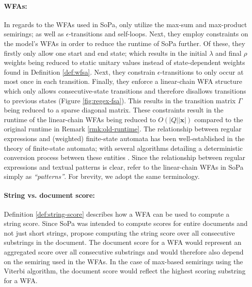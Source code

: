 \paragraph{WFAs:} In regards to the WFAs used in SoPa, \citet{schwartz2018sopa} only utilize the max-sum and max-product semirings; as well as $\epsilon$-transitions and self-loops. Next, they employ constraints on the model's WFAs in order to reduce the runtime of SoPa further. Of these, they firstly only allow one start and end state; which results in the initial $\lambda$ and final $\rho$ weights being reduced to static unitary values instead of state-dependent weights found in Definition \ref{def:wfsa}. Next, they constrain $\epsilon$-transitions to only occur at most once in each transition. Finally, they enforce a linear-chain WFA structure which only allows consecutive-state transitions and therefore disallows transitions to previous states (Figure \ref{fig:regex-fsa}). This results in the transition matrix $\Gamma$ being reduced to a sparse diagonal matrix. These constraints result in the runtime of the linear-chain WFAs being reduced to $O(|Q||\pmb{x}|)$ compared to the original runtime in Remark \ref{rmk:old-runtime}. The relationship between regular expressions and (weighted) finite-state automata has been well-established in the theory of finite-state automata; with several algorithms detailing a deterministic conversion process between these entities \citep{thompson1968programming,jiang2020cold}. Since the relationship between regular expressions and textual patterns is clear, \citet[Page 3, Section 3.1]{schwartz2018sopa} refer to the linear-chain WFAs in SoPa simply as \textit{``patterns''}. For brevity, we adopt the same terminology.

\paragraph{String vs. document score:} Definition \ref{def:string-score} describes how a WFA can be used to compute a string score. Since SoPa was intended to compute scores for entire documents and not just short strings, \citet{schwartz2018sopa} propose computing the string score over all consecutive substrings in the document. The document score for a WFA would represent an aggregated score over all consecutive substrings and would therefore also depend on the semiring used in the WFAs. In the case of max-based semirings using the Viterbi algorithm, the document score would reflect the highest scoring substring for a WFA.

